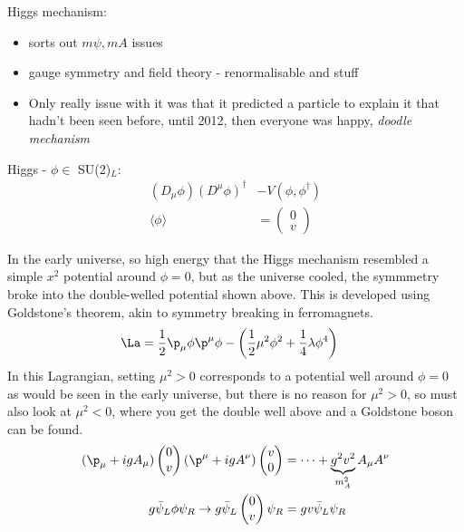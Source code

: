 \documentclass[a4paper, 11pt, normalem]{article}
\begin{document}
Higgs mechanism:
\begin{itemize}
    \item sorts out $m\psi,mA$ issues
    \item gauge symmetry and field theory - renormalisable and stuff
    \item Only really issue with it was that it predicted a particle to explain it that hadn't been seen before, until 2012, then everyone was happy, \textit{doodle mechanism}
\end{itemize}
\begin{multicols}{2}
Higgs - $\phi \in$ SU(2)$_L$:
\begin{align}
    (D_\mu\phi)(D^\mu\phi)^\dagger &- V(\phi,\phi^\dagger) \\
    \langle\phi\rangle &= \begin{pmatrix} 0 \\ v\end{pmatrix}
\end{align}
    \begin{figure}[H]
    \centering
\end{figure}
\end{multicols}
In the early universe, so high energy that the Higgs mechanism resembled a simple $x^2$ potential around $\phi=0$, but as the universe cooled, the symmmetry broke into the double-welled potential shown above. 
This is developed using Goldstone's theorem, akin to symmetry breaking in ferromagnets.
\begin{align}
    \La &= \frac12\p_\mu\phi\p^\mu\phi - \left(\frac12\mu^2\phi^2 + \frac14\lambda\phi^4\right)
\end{align}
In this Lagrangian, setting $\mu^2>0$ corresponds to a potential well around $\phi=0$ as would be seen in the early universe, but there is no reason for $\mu^2>0$, so must also look at $\mu^2<0$, where you get the double well above and a Goldstone boson can be found.
\begin{align}
    (\p_\mu + igA_\mu)\begin{pmatrix} 0 \\ v\end{pmatrix} (\p^\mu + igA^\nu)\begin{pmatrix}v \\ 0\end{pmatrix} &= \dots + \underbrace{g^2v^2}_{m_A^2}A_\mu A^\nu \\
    g\bar{\psi}_L\phi\psi_R \to g\bar{\psi}_L\begin{pmatrix} 0\\ v\end{pmatrix} \psi_R &= gv\bar{\psi}_L\psi_R
\end{align}
\end{document}
